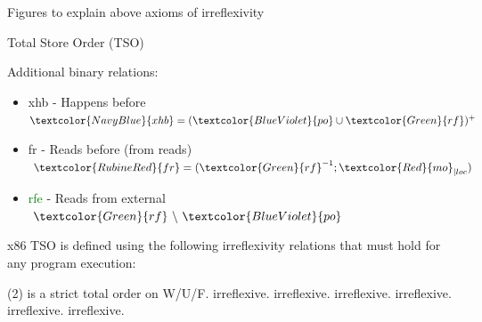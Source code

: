 \documentclass[xcolor={dvipsnames}, notes]{beamer}
\newcommand{\po}{\textcolor{BlueViolet}{po}}
\newcommand{\rf}{\textcolor{Green}{rf}}
\newcommand{\mo}{\textcolor{Red}{mo}}
\newcommand{\fr}{\textcolor{RubineRed}{fr}}
\newcommand{\xhb}{\textcolor{NavyBlue}{xhb}}
\newcommand{\rfe}{\textcolor{Green}{rfe}}
\begin{document}
    \begin{frame}{Figures to explain above axioms of irreflexivity}
        
        \begin{figure}
        \end{figure}

        \begin{figure}
        \end{figure}

    \end{frame}

    \begin{frame}{Total Store Order (TSO)}

        Additional binary relations:
        \begin{itemize}
            \item {\xhb} - Happens before $ \xhb = (\po \cup \rf)^{+} $
            \item {\fr} - Reads before (from reads) $ \fr = (\rf^{-1};\mo_{|loc}) $ 
            \item {\rfe} - Reads from external $\rf \text{ \textbackslash} \ \po$
        \end{itemize}

        x86 TSO is defined using the following irreflexivity relations that must hold for any program execution:
        \begin{tasks}(2)
            \task {\mo} is a strict total order on W/U/F.
            \task {\xhb} irreflexive.
            \task {\mo;\xhb} irreflexive.
            \task {\fr;\xhb} irreflexive.
            \task {\fr;\mo} irreflexive.
            \task {\fr;\mo;\rfe;\po} irreflexive.
            \task {\fr;\mo;$[U \cup F]$;\po} irreflexive.
        \end{tasks}

    \end{frame}
\end{document}
